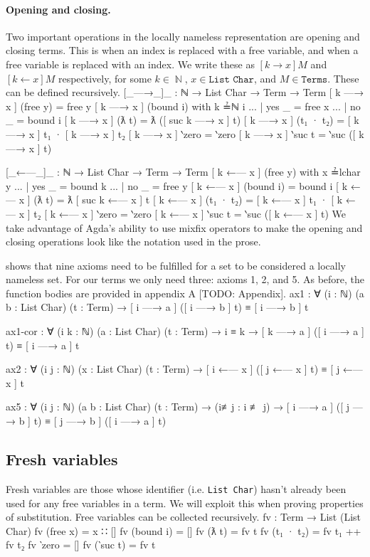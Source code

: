 \documentclass[logo,bsc,singlespacing,parskip,online]{infthesis}
\DeclareMathOperator{\nat}{\mathbb{N}}
\renewenvironment{code}{\mintedcopy[breaklines,breaksymbolleft=\;]{agda}}{\endmintedcopy}
\begin{document}
\paragraph*{Opening and closing.} Two important operations in the locally nameless representation are
opening and closing terms. This is when an index is replaced with a free variable, and when a free
variable is replaced with an index. We write these as $[k \to x] M$ and $[k \leftarrow x] M$
respectively, for some $k \in \nat$, $x \in \texttt{List Char}$, and $M \in \texttt{Terms}$. These
can be defined recursively.
\begin{code}
[_—→_]_ : ℕ → List Char → Term → Term
[ k —→ x ] (free y) = free y
[ k —→ x ] (bound i) with k ≟ℕ i
... | yes _ = free x
... | no  _ = bound i
[ k —→ x ] (ƛ t) = ƛ ([ suc k —→ x ] t)
[ k —→ x ] (t₁ · t₂) = [ k —→ x ] t₁ · [ k —→ x ] t₂
[ k —→ x ] ‵zero = ‵zero
[ k —→ x ] ‵suc t = ‵suc ([ k —→ x ] t)

[_←—_]_ : ℕ → List Char → Term → Term
[ k ←— x ] (free y) with x ≟lchar y
... | yes _ = bound k
... | no  _ = free y
[ k ←— x ] (bound i) = bound i
[ k ←— x ] (ƛ t) = ƛ [ suc k ←— x ] t
[ k ←— x ] (t₁ · t₂) = [ k ←— x ] t₁ · [ k ←— x ] t₂
[ k ←— x ] ‵zero = ‵zero
[ k ←— x ] ‵suc t = ‵suc ([ k ←— x ] t)
\end{code}
We take advantage of Agda's ability to use mixfix operators to make the opening and closing
operations look like the notation used in the prose.

\citet{pitts_locally_2023} shows that nine axioms need to be fulfilled for a set to be considered a
locally nameless set. For our terms we only need three: axioms 1, 2, and 5. As before, the function
bodies are provided in appendix A [TODO: Appendix].
\begin{code}
ax1 : ∀ (i : ℕ) (a b : List Char) (t : Term)
  → [ i —→ a ] ([ i —→ b ] t) ≡ [ i —→ b ] t

ax1-cor : ∀ (i k : ℕ) (a : List Char) (t : Term)
  → i ≡ k
  → [ k —→ a ] ([ i —→ a ] t) ≡ [ i —→ a ] t

ax2 : ∀ (i j : ℕ) (x : List Char) (t : Term)
  → [ i ←— x ] ([ j ←— x ] t) ≡ [ j ←— x ] t

ax5 : ∀ (i j : ℕ) (a b : List Char) (t : Term)
  → (i≢j : i ≢ j)
  → [ i —→ a ] ([ j —→ b ] t) ≡ [ j —→ b ] ([ i —→ a ] t)
\end{code}

\subsection{Fresh variables}
Fresh variables are those whose identifier (i.e. \texttt{List Char}) hasn't already been used for
any free variables in a term. We will exploit this when proving properties of substitution. Free
variables can be collected recursively.
\begin{code}
fv : Term → List (List Char)
fv (free x) = x ∷ []
fv (bound i) = []
fv (ƛ t) = fv t
fv (t₁ · t₂) = fv t₁ ++ fv t₂
fv ‵zero = []
fv (‵suc t) = fv t
\end{code}
\end{document}
